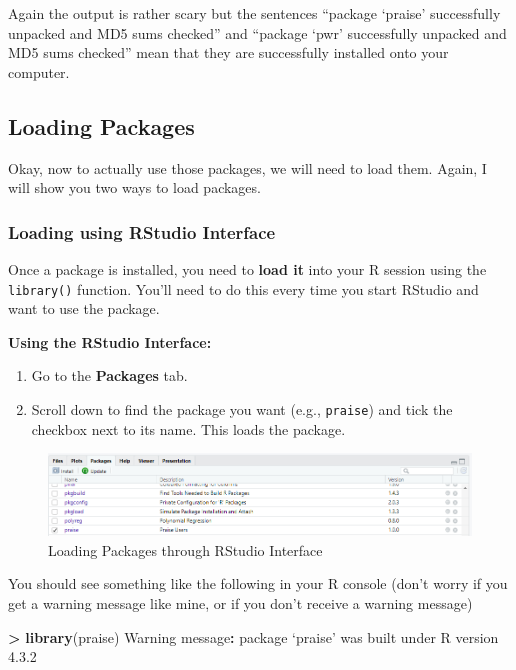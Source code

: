 \documentclass[
]{book}
\newenvironment{Shaded}{\begin{snugshade}}{\end{snugshade}}
\newcommand{\DecValTok}[1]{\textcolor[rgb]{0.00,0.00,0.81}{#1}}
\newcommand{\FloatTok}[1]{\textcolor[rgb]{0.00,0.00,0.81}{#1}}
\newcommand{\FunctionTok}[1]{\textcolor[rgb]{0.13,0.29,0.53}{\textbf{#1}}}
\newcommand{\NormalTok}[1]{#1}
\newcommand{\SpecialCharTok}[1]{\textcolor[rgb]{0.81,0.36,0.00}{\textbf{#1}}}
\begin{document}
Again the output is rather scary but the sentences ``package `praise' successfully unpacked and MD5 sums checked'' and ``package `pwr' successfully unpacked and MD5 sums checked'' mean that they are successfully installed onto your computer.

\subsection{Loading Packages}\label{loading-packages}

Okay, now to actually use those packages, we will need to load them. Again, I will show you two ways to load packages.

\subsubsection{Loading using RStudio Interface}\label{loading-using-rstudio-interface}

Once a package is installed, you need to \textbf{load it} into your R session using the \texttt{library()} function. You'll need to do this every time you start RStudio and want to use the package.

\textbf{Using the RStudio Interface:}

\begin{enumerate}
\def\labelenumi{\arabic{enumi}.}
\item
  Go to the \textbf{Packages} tab.
\item
  Scroll down to find the package you want (e.g., \texttt{praise}) and tick the checkbox next to its name. This loads the package.
\end{enumerate}

\begin{figure}
\centering
\includegraphics{img/04-praise-loaded.png}
\caption{\label{fig:unnamed-chunk-131}Loading Packages through RStudio Interface}
\end{figure}

You should see something like the following in your R console (don't worry if you get a warning message like mine, or if you don't receive a warning message)

\begin{Shaded}
\begin{Highlighting}[]
\SpecialCharTok{\textgreater{}} \FunctionTok{library}\NormalTok{(praise)}
\NormalTok{Warning message}\SpecialCharTok{:}
\NormalTok{package ‘praise’ was built under R version }\DecValTok{4}\NormalTok{.}\FloatTok{3.2} 
\end{Highlighting}
\end{Shaded}
\end{document}
